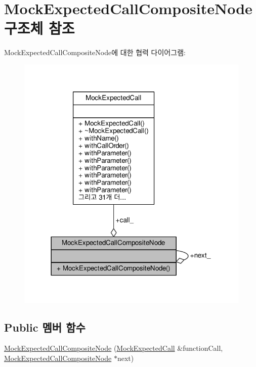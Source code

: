 \hypertarget{struct_mock_expected_call_composite_node}{}\section{Mock\+Expected\+Call\+Composite\+Node 구조체 참조}
\label{struct_mock_expected_call_composite_node}


Mock\+Expected\+Call\+Composite\+Node에 대한 협력 다이어그램\+:
\nopagebreak
\begin{figure}[H]
\begin{center}
\leavevmode
\includegraphics[width=317pt]{struct_mock_expected_call_composite_node__coll__graph}
\end{center}
\end{figure}
\subsection*{Public 멤버 함수}
\begin{DoxyCompactItemize}
\item 
\hyperlink{struct_mock_expected_call_composite_node_aa4956f96a213cdacb512423053826d29}{Mock\+Expected\+Call\+Composite\+Node} (\hyperlink{class_mock_expected_call}{Mock\+Expected\+Call} \&function\+Call, \hyperlink{struct_mock_expected_call_composite_node}{Mock\+Expected\+Call\+Composite\+Node} $\ast$next)
\end{DoxyCompactItemize}
